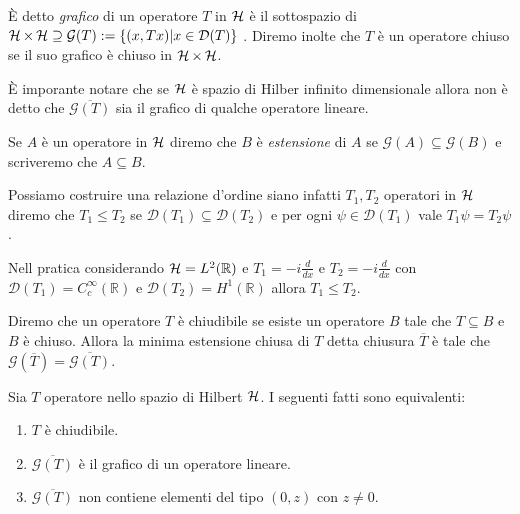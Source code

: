 \begin{definition}
    È detto \emph{grafico} di un operatore $T$ in $ \operatorname{\mathcal{H}} $ è il sottospazio di $ \operatorname{\mathcal{H}} \times \operatorname{\mathcal{H}} \supseteq \mathcal{G}(T):= \{ (x, Tx) | x \in \mathcal{D}(T) \}$ . 
Diremo inolte che $T$ è un operatore chiuso se il suo grafico è chiuso in $\operatorname{\mathcal{H}} \times \operatorname{\mathcal{H}}$.
\end{definition}

È imporante notare che se $\operatorname{\mathcal{H}}$ è spazio di Hilber infinito dimensionale allora non è detto che $\overline{\mathcal{G}(T)}$ sia il grafico di qualche operatore lineare.

\begin{definition}
    Se $A$ è un operatore in $\operatorname{\mathcal{H}}$ diremo che $B$ è \emph{estensione} di $A$ se $\mathcal{G}(A) \subseteq \mathcal{G}(B) $ e scriveremo che $A \subseteq B$. 
\end{definition}

\begin{example}
    Possiamo costruire una relazione d'ordine siano infatti $T_1, T_2$ operatori in $\operatorname{\mathcal{H}}$ diremo che $T_1 \leq T_2$ se $\mathcal{D}(T_1) \subseteq \mathcal{D}(T_2)$ e per ogni $\psi \in \mathcal{D}(T_1)$ vale $T_1 \psi = T_2 \psi$.

    Nell pratica considerando $\operatorname{\mathcal{H}} = L^2(\mathbb{R})$ e $T_1 = -i \frac{d}{dx}$ e $T_2 = -i \frac{d}{dx}$ con $\mathcal{D}(T_1) = C^\infty_c(\mathbb{R})$ e $\mathcal{D}(T_2) = H^1(\mathbb{R})$ allora $T_1 \leq T_2$.
\end{example}

\begin{definition}
    Diremo che un operatore $T$ è chiudibile se esiste un operatore $B$ tale che $T \subseteq B$ e $B$ è chiuso. Allora la minima estensione chiusa di $T$ detta chiusura $\overline{T}$ è tale che $\mathcal{G}(\overline{T}) = \overline{\mathcal{G}(T)}$.
\end{definition}


\begin{proposition}
    Sia $T$ operatore nello spazio di Hilbert $\operatorname{\mathcal{H}}$. I seguenti fatti sono equivalenti:
\begin{enumerate}
    \item $T$ è chiudibile.
    \item $\overline{\mathcal{G}(T)}$ è il grafico di un operatore lineare.
    \item $\overline{\mathcal{G}(T)}$ non contiene elementi del tipo $(0,z)$ con $z \neq 0$.
\end{enumerate}
\end{proposition}


